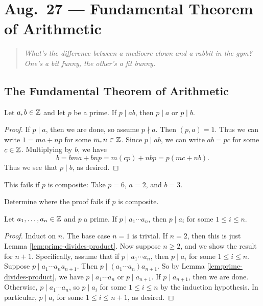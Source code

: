 \chapter{Aug.~27 --- Fundamental Theorem of Arithmetic}

\begin{quote}
  \emph{What's the difference between a mediocre clown and a rabbit in the gym? One's a bit funny, the other's a fit bunny.}
\end{quote}

\section{The Fundamental Theorem of Arithmetic}

\begin{lemma}[Euclid]\label{lem:prime-divides-product}
  Let $a, b \in \mathbb{Z}$ and let $p$ be a prime.
  If $p \mid ab$, then $p \mid a$
  or $p \mid b$.
\end{lemma}

\begin{proof}
  If $p \mid a$, then we are done, so
  assume $p \nmid a$. Then
  $(p, a) = 1$. Thus we can write
  $1 = ma + np$ for some $m, n \in \mathbb{Z}$.
  Since $p \mid ab$, we can write
  $ab = pc$ for some $c \in \mathbb{Z}$.
  Multiplying by $b$, we have
  \[
    b = bma + bnp
    = m(cp) + nb p
    = p(mc + nb).
  \]
  Thus we see that
  $p \mid b$, as desired.
\end{proof}

\begin{remark}
  This fails if $p$ is composite:
  Take $p = 6$, $a = 2$, and $b = 3$.
\end{remark}

\begin{exercise}
  Determine where the proof fails
  if $p$ is composite.
\end{exercise}

\begin{corollary}
  Let $a_1, \dots, a_n \in \mathbb{Z}$ and $p$
  a prime. If $p \mid a_1 \cdots a_n$,
  then $p \mid a_i$ for some $1 \le i \le n$.
\end{corollary}

\begin{proof}
  Induct on $n$. The base case $n = 1$
  is trivial. If $n = 2$, then this is
  just Lemma \ref{lem:prime-divides-product}.
  Now suppose $n \ge 2$, and we show the
  result for $n + 1$. Specifically,
  assume that if $p \mid a_1 \cdots a_n$,
  then $p \mid a_i$ for some
  $1 \le i \le n$. Suppose
  $p \mid a_1 \cdots a_n a_{n+1}$.
  Then $p \mid (a_1 \cdots a_n) a_{n+1}$.
  So by Lemma \ref{lem:prime-divides-product},
  we have $p \mid a_1 \cdots a_n$
  or $p \mid a_{n + 1}$. If $p \mid a_{n + 1}$, then we are done.
  Otherwise, $p \mid a_1 \cdots a_n$,
  so $p \mid a_i$ for some $1 \le i \le n$
  by the induction hypothesis.
  In particular, $p \mid a_i$ for some
  $1 \le i \le n + 1$, as desired.
\end{proof}

